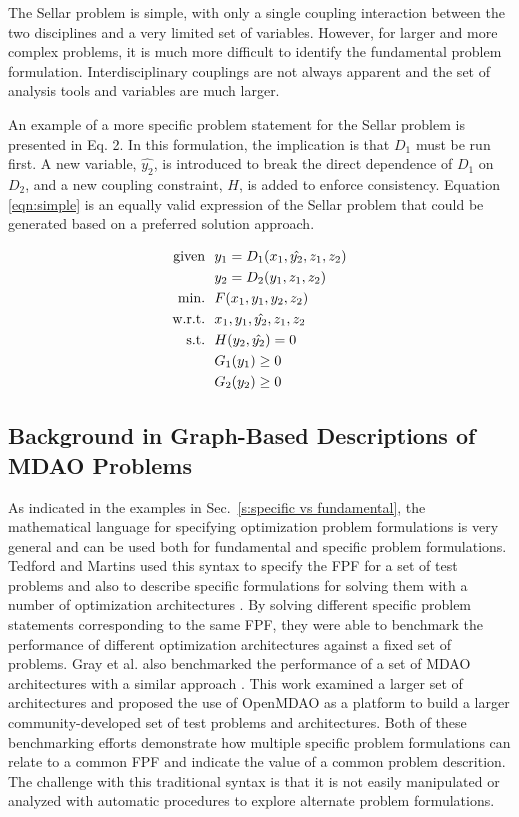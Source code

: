     The Sellar problem is simple, with only a single coupling interaction 
    between the two disciplines and a very limited set of variables. 
 However, for larger and more complex problems, 
    it is much more difficult to identify the fundamental problem formulation. Interdisciplinary 
    couplings are not always apparent and the set of analysis tools and variables are 
    much larger. 

An example of a more specific problem statement for the Sellar problem is presented in Eq. 2.  
In this formulation, the implication is that  $D_1$ must be run 
    first. A new variable, $\hat{y_2}$, is introduced to break the direct dependence of
    $D_1$ on $D_2$, and a new coupling constraint, $H$, is added to enforce 
    consistency. Equation \ref{eqn:simple} is 
    an equally valid expression of the Sellar problem that could be 
    generated  based on a preferred solution approach.

    \begin{align}
        \textrm{given} & \ \ y_1 = D_1(x_1,\hat{y_2},z_1,z_2) \notag
        \\      & \ \ y_2 = D_2(y_1,z_1,z_2) \notag
        \\\textrm{min.} &\ \ F(x_1,y_1,y_2,z_2) \notag
        \\\textrm{w.r.t.} & \ \ x_1,y_1,\hat{y_2},z_1,z_2 \notag
        \\\textrm{s.t.} & \ \ H(y_2,\hat{y_2}) = 0 \notag 
        \\     & \ \ G_1(y_1) \geq 0 \notag
        \\     & \ \ G_2(y_2) \geq 0
        \label{eqn:simple}
    \end{align}


\subsection{Background in Graph-Based Descriptions of MDAO Problems}
	\label{s:existing syntax}
    As indicated in the examples in Sec.~\ref{s:specific vs fundamental}, the mathematical 
    language for specifying optimization problem formulations is very general and can be used both for 
    fundamental and specific problem formulations. Tedford and Martins used this syntax to specify the 
    FPF for a set of test problems and also to describe specific formulations for solving them with a 
    number of optimization architectures \cite{Tedford2009}. By solving different specific problem statements corresponding to the same FPF, they were able to  benchmark the performance of different optimization architectures against a fixed set of 
    problems. Gray et al. also benchmarked the performance of a set of MDAO architectures  with a similar approach \cite{Gray2013}. 
    This work examined a larger set of architectures and proposed the use of OpenMDAO as a platform to build a larger community-developed set of test problems and architectures. Both of these benchmarking efforts 
    demonstrate how multiple specific problem formulations can relate to a common FPF and indicate the 
    value of a common problem descrition. The challenge with this 
    traditional syntax is that it is not easily manipulated or analyzed with automatic procedures to explore alternate problem formulations. 

